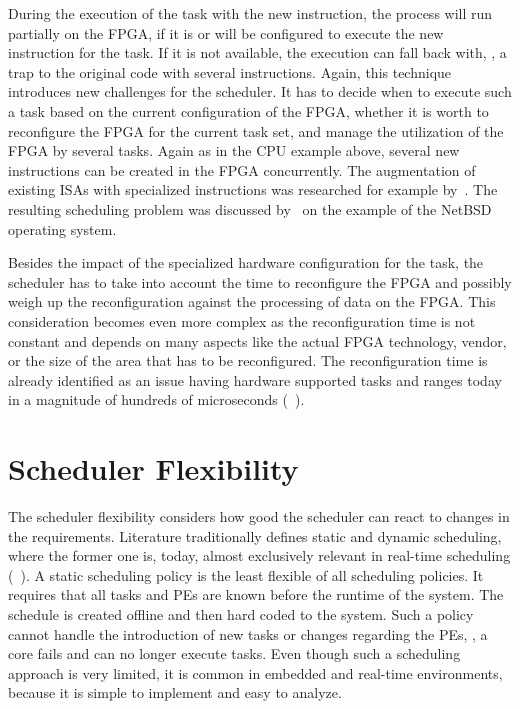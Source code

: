 During the execution of the task with the new instruction, the process will run partially on the FPGA, if it is or will be configured to execute the new instruction for the task. If it is not available, the execution can fall back with, \eg, a trap to the original code with several instructions. Again, this technique introduces new challenges for the scheduler. It has to decide when to execute such a task based on the current configuration of the \ac{FPGA}, whether it is worth to reconfigure the \ac{FPGA} for the current task set, and manage the utilization of the \ac{FPGA} by several tasks. Again as in the \ac{CPU} example above, several new instructions can be created in the \ac{FPGA} concurrently. The augmentation of existing \acp{ISA} with specialized instructions was researched for example by~\textcite{Pittman-2006-eMIPS}. The resulting scheduling problem was discussed by~\textcite{Sheldon-2010-eMIPSSched} on the example of the NetBSD~\cite{NetBSD} operating system.

Besides the impact of the specialized hardware configuration for the task, the scheduler has to take into account the time to reconfigure the \ac{FPGA} and possibly weigh up the reconfiguration against the processing of data on the \ac{FPGA}. This consideration becomes even more complex as the reconfiguration time is not constant and depends on many aspects like the actual \ac{FPGA} technology, vendor, or the size of the area that has to be reconfigured. The reconfiguration time is already identified as an issue having hardware supported tasks and ranges today in a magnitude of hundreds of microseconds (\cf~\textcite{Duhem-2011-FaRM}).

\section{Scheduler Flexibility}%
\label{sec:flexibility}

The scheduler flexibility considers how good the scheduler can react to changes in the requirements. Literature traditionally defines static and dynamic scheduling, where the former one is, today, almost exclusively relevant in real-time scheduling (\cf~\textcite{Ramamritham-1994-RTTypes}). A static scheduling policy is the least flexible of all scheduling policies. It requires that all tasks and \acp{PE} are known before the runtime of the system. The schedule is created offline and then hard coded to the system. Such a policy cannot handle the introduction of new tasks or changes regarding the \acp{PE}, \eg, a core fails and can no longer execute tasks. Even though such a scheduling approach is very limited, it is common in embedded and real-time environments, because it is simple to implement and easy to analyze.

